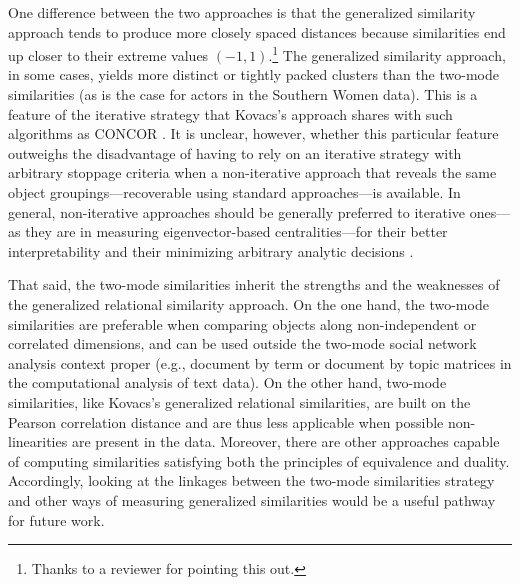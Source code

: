 \documentclass[a4paper,fleqn]{cas-sc}
\begin{document}
One difference between the two approaches is that the generalized similarity approach tends to produce more closely spaced distances because similarities end up closer to their extreme values $(-1, 1)$.\footnote{Thanks to a reviewer for pointing this out.} The generalized similarity approach, in some cases, yields more distinct or tightly packed clusters than the two-mode similarities (as is the case for actors in the Southern Women data). This is a feature of the iterative strategy that Kovacs's approach shares with such algorithms as CONCOR \citep{chen2002generalized}. It is unclear, however, whether this particular feature outweighs the disadvantage of having to rely on an iterative strategy with arbitrary stoppage criteria when a non-iterative approach that reveals the same object groupings---recoverable using standard approaches---is available. In general, non-iterative approaches should be generally preferred to iterative ones---as they are in measuring eigenvector-based centralities---for their better interpretability and their minimizing arbitrary analytic decisions \citep{mealy2019interpreting}.

That said, the two-mode similarities inherit the strengths and the weaknesses of the generalized relational similarity approach. On the one hand, the two-mode similarities are preferable when comparing objects along non-independent or correlated dimensions, and can be used outside the two-mode social network analysis context proper (e.g., document by term or document by topic matrices in the computational analysis of text data). On the other hand, two-mode similarities, like Kovacs's generalized relational similarities, are built on the Pearson correlation distance and are thus less applicable when possible non-linearities are present in the data. Moreover, there are other approaches capable of computing similarities satisfying both the principles of equivalence and duality. Accordingly, looking at the linkages between the two-mode similarities strategy and other ways of measuring generalized similarities would be a useful pathway for future work. 

%


\end{document}
